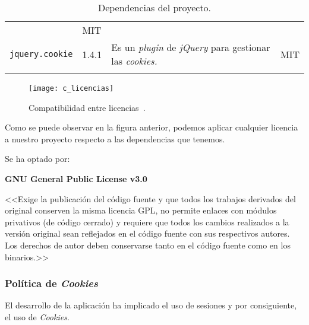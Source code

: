 \begin{longtable}[]{@{}llll@{}}
\begin{minipage}[t]{0.49\columnwidth}
\end{minipage} & \begin{minipage}[t]{0.11\columnwidth}\raggedright\strut
MIT\strut
\end{minipage}\tabularnewline
\begin{minipage}[t]{0.18\columnwidth}\raggedright\strut
\texttt{jquery.cookie}\strut
\end{minipage} & \begin{minipage}[t]{0.08\columnwidth}\raggedright\strut
1.4.1\strut
\end{minipage} & \begin{minipage}[t]{0.49\columnwidth}\raggedright\strut
Es un \emph{plugin} de \emph{jQuery} para gestionar las \emph{cookies.} \strut
\end{minipage} & \begin{minipage}[t]{0.11\columnwidth}\raggedright\strut
MIT\strut
\end{minipage}\tabularnewline
\bottomrule
\caption{Dependencias del proyecto.}
\end{longtable}

\begin{figure}[H]
	\centering
	\texttt{[image: c\_licencias]}
	\caption[Compatibilidad entre licencias]{Compatibilidad entre licencias~\cite{licencias}.}
	\label{fig:c_licencias}
\end{figure}

Como se puede observar en la figura anterior, podemos aplicar cualquier licencia a nuestro proyecto respecto a las dependencias que tenemos.

Se ha optado por: 

\textbf{GNU General Public License v3.0}\

<<Exige la publicación del código fuente y que todos los trabajos derivados del original conserven la misma licencia GPL, no permite enlaces con módulos privativos (de código cerrado) y requiere que todos los cambios realizados a la versión original sean reflejados en el código fuente con sus respectivos autores.
Los derechos de autor deben conservarse tanto en el código fuente como en los binarios.>>~\cite{GNU}

\subsubsection{Política de \emph{Cookies}}

El desarrollo de la aplicación ha implicado el uso de sesiones y por consiguiente, el uso de \emph{Cookies}. 

